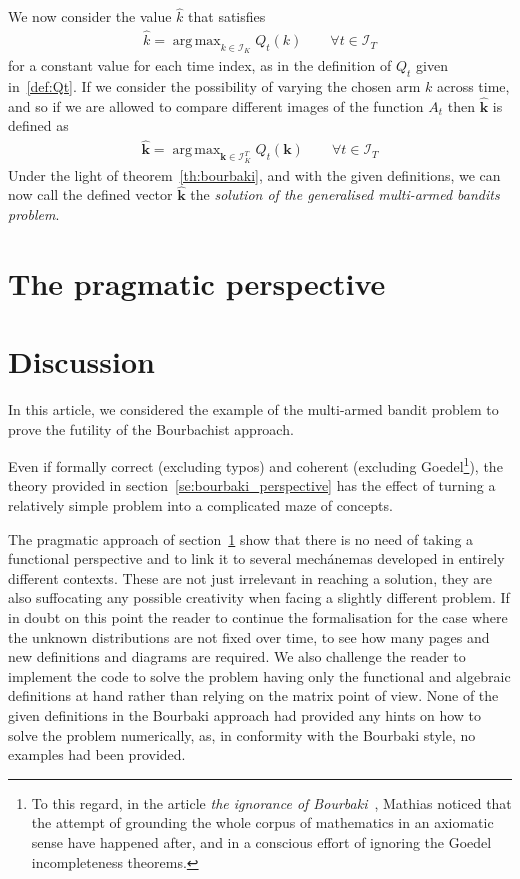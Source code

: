 \documentclass[]{scrartcl}
\DeclareMathOperator*{\argmax}{arg\,max}
\theoremstyle{definition}
\begin{document}
We now consider the value $\hat{k}$ that satisfies
\begin{align*}
\hat{k} = \argmax_{k \in \mathcal{I}_K} Q_t(k)
\qquad
\forall t \in \mathcal{I}_T
\end{align*}
for a constant value for each time index, as in the definition of $Q_t$ given in~\ref{def:Qt}. 
If we consider the possibility of varying the chosen arm $k$ across time, and so if we are allowed to compare different images of the function $A_t$ then $\hat{\mathbf{k}}$ is defined as
\begin{align}\label{eq:bourbaki_solution}
\hat{\mathbf{k}} 
= 
\argmax_{\mathbf{k} \in \mathcal{I}_K^{T}} Q_t(\mathbf{k})
\qquad
\forall t \in \mathcal{I}_T
\end{align}
Under the light of theorem~\ref{th:bourbaki}, and with the given definitions, we can now call the defined vector $\hat{\mathbf{k}}$ the \emph{solution of the generalised multi-armed bandits problem}.

\section{The pragmatic perspective}
\label{se:pragmatic_perspective}


\section{Discussion}
\label{se:outro}
In this article, we considered the example of the multi-armed bandit problem to prove the futility of the Bourbachist approach. 

Even if formally correct (excluding typos) and coherent (excluding Goedel\footnote{
    To this regard, in the article \emph{the ignorance of Bourbaki}~\cite{mathias1992ignorance}, Mathias noticed that the attempt of grounding the whole corpus of mathematics in an axiomatic sense have happened after, and in a conscious effort of ignoring the Goedel incompleteness theorems.
}), the theory provided in section~\ref{se:bourbaki_perspective} has the effect of turning a relatively simple problem into a complicated maze of concepts.

The pragmatic approach of section~\ref{se:pragmatic_perspective} show that there is no need of taking a functional perspective and to link it to several mechánemas developed in entirely different contexts. These are not just irrelevant in reaching a solution, they are also suffocating any possible creativity when facing a slightly different problem. If in doubt on this point the reader to continue the formalisation for the case where the unknown distributions are not fixed over time, to see how many pages and new definitions and diagrams are required. We also challenge the reader to implement the code to solve the problem having only the functional and algebraic definitions at hand rather than relying on the matrix point of view. None of the given definitions in the Bourbaki approach had provided any hints on how to solve the problem numerically, as, in conformity with the Bourbaki style, no examples had been provided. 
\end{document}
